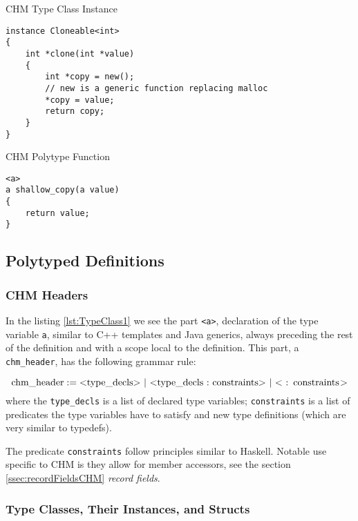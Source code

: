 \begin{listing}
\caption{CHM Type Class Instance}
\label{lst:Instance}
\begin{lstlisting}
instance Cloneable<int>
{
    int *clone(int *value)
    {
        int *copy = new();
        // new is a generic function replacing malloc
        *copy = value;
        return copy;
    }
}
\end{lstlisting}
\end{listing}

\begin{listing}
\caption{CHM Polytype Function}
\label{lst:Function}
\begin{lstlisting}
<a>
a shallow_copy(a value)
{
    return value;
}
\end{lstlisting}
\end{listing}

\subsection{Polytyped Definitions}


\subsubsection{CHM Headers}
In the listing \ref{lst:TypeClass1} we see the part \lstinline{<a>}, declaration of the type variable \lstinline{a}, similar to C++ templates and Java generics, always preceding the rest of the definition and with a scope local to the definition. This part, a \lstinline{chm_header}, has the following grammar rule:

\begin{defn}
    $$\text{\lstinline{chm_header}} := \text{\lstinline{<type_decls>}}\ |\ \text{\lstinline{<type_decls : constraints>}}\ |\ \text{\lstinline{< : constraints>}}$$
    where the \lstinline{type_decls} is a list of declared type variables; \lstinline{constraints} is a list of predicates the type variables have to satisfy and new type definitions (which are very similar to typedefs).
\end{defn}

The predicate \lstinline{constraints} follow principles similar to Haskell. Notable use specific to CHM is they allow for member accessors, see the section \ref{ssec:recordFieldsCHM} \emph{record fields}.

\subsubsection{Type Classes, Their Instances, and Structs}

